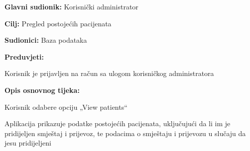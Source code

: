 					\noindent {}
					\begin{packed_item}
						\item \textbf{Glavni sudionik:} Korisnički administrator
						\item  \textbf{Cilj:} Pregled postojećih pacijenata
						\item  \textbf{Sudionici:} Baza podataka
						\item  \textbf{Preduvjeti:}
						\item[] \begin{packed_enum}
							\item Korisnik je prijavljen na račun sa ulogom korisničkog administratora
						\end{packed_enum}
						
						\item  \textbf{Opis osnovnog tijeka:}
						\item[] \begin{packed_enum}
							\item Korisnik odabere opciju „View patients“
							\item Aplikacija prikazuje podatke postojećih pacijenata, uključujući da li im je pridijeljen smještaj i prijevoz, te podacima o smještaju i prijevozu u slučaju da jesu pridijeljeni
						\end{packed_enum}
					\end{packed_item}
					
